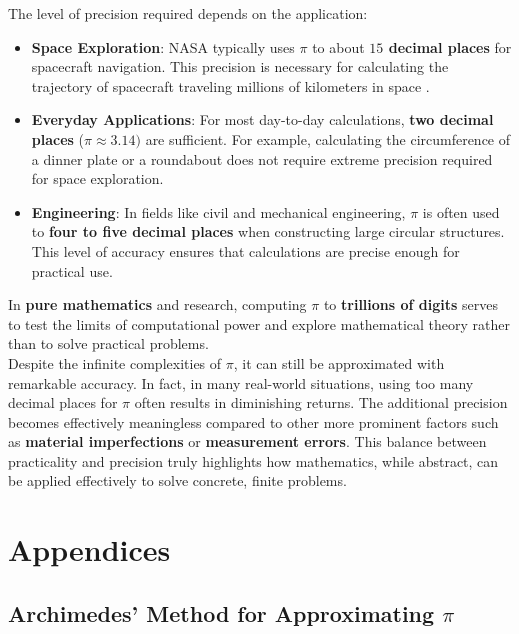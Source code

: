 \documentclass[12pt]{article}
\begin{document}
\noindent The level of precision required depends on the application:

\begin{itemize}
    \item \textbf{Space Exploration}: NASA typically uses $\pi$ to about \textbf{$15$ decimal places} for spacecraft navigation. This precision is necessary for calculating the trajectory of spacecraft traveling millions of kilometers in space \cite{nasa_pi}.
    \item \textbf{Everyday Applications}: For most day-to-day calculations, \textbf{two decimal places} ($\pi \approx 3.14)$ are sufficient. For example, calculating the circumference of a dinner plate or a roundabout does not require extreme precision required for space exploration.
    \item \textbf{Engineering}: In fields like civil and mechanical engineering, $\pi$ is often used to \textbf{four to five decimal places} when constructing large circular structures. This level of accuracy ensures that calculations are precise enough for practical use.
\end{itemize}

\noindent In \textbf{pure mathematics} and research, computing $\pi$ to \textbf{trillions of digits} serves to test the limits of computational power and explore mathematical theory rather than to solve practical problems.\\

\noindent Despite the infinite complexities of $\pi$, it can still be approximated with remarkable accuracy. In fact, in many real-world situations, using too many decimal places for $\pi$ often results in diminishing returns. The additional precision becomes effectively meaningless compared to other more prominent factors such as \textbf{material imperfections} or \textbf{measurement errors}. This balance between practicality and precision truly highlights how mathematics, while abstract, can be applied effectively to solve concrete, finite problems. 

\newpage

\appendix

\section{Appendices}

\subsection{Archimedes' Method for Approximating $\pi$}\label{appendix:1}
\end{document}
